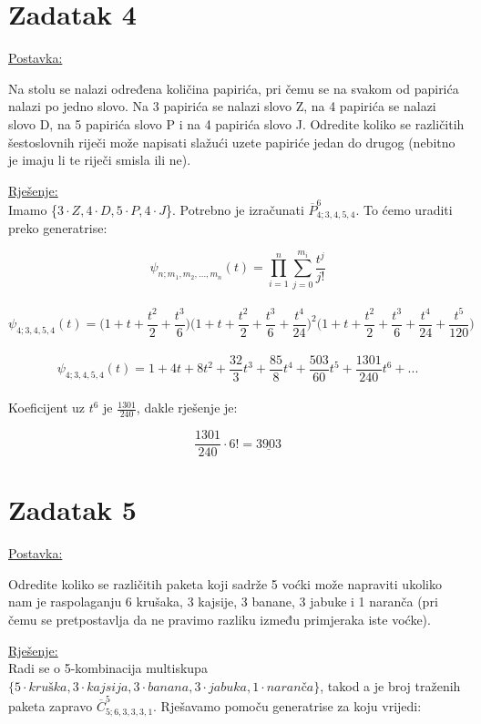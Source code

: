 \documentclass[12pt]{article}
\begin{document}
\section*{Zadatak 4\label{Z4}}	 

\underline{Postavka:}

Na stolu se nalazi određena količina papirića, pri čemu se na svakom od papirića nalazi po jedno slovo. Na 3 papirića se nalazi slovo Z, na 4 papirića se nalazi slovo D, na 5 papirića slovo P i na 4 papirića slovo J. Odredite koliko se različitih šestoslovnih riječi može napisati slažući uzete papiriće jedan do drugog (nebitno je imaju li te riječi smisla ili ne).

\underline{Rješenje:}\\

Imamo \{$3\cdot Z, 4 \cdot D, 5\cdot P, 4\cdot J$\}. Potrebno je izračunati $\overline{P}_{4; 3, 4, 5, 4}^{6}$. To ćemo uraditi preko generatrise:

$$\psi_{n; m_{1}, m_{2},..., m_{n}}(t) = \prod_{i=1}^{n}\sum_{j=0}^{m_{i}} \frac{t^j}{j!}$$\\
$$\psi_{4; 3, 4, 5, 4}(t) = \bigg(1 + t + \frac{t^2}{2} + \frac{t^3}{6}\bigg)\bigg(1 + t + \frac{t^2}{2} + \frac{t^3}{6} + \frac{t^4}{24}\bigg)^2\bigg(1 + t + \frac{t^2}{2} + \frac{t^3}{6} + \frac{t^4}{24} + \frac{t^5}{120}\bigg)$$\\
$$\psi_{4; 3, 4, 5, 4}(t) =  1 + 4t +  8 t^2 +  \frac{32}{3}t^3 + \frac{85}{8} t^4 +  \frac{503}{60}t^5+\frac{1301}{240} t^6 + ...$$\\

Koeficijent uz $t^6$ je $\frac{1301}{240}$, dakle rješenje je:

$$\frac{1301}{240} \cdot 6! = \underline{3903}$$
\newpage
\section*{Zadatak 5\label{Z5}}	 

\underline{Postavka:}

Odredite koliko se različitih paketa koji sadrže 5 voćki može napraviti ukoliko nam je raspolaganju 6 krušaka, 3 kajsije, 3 banane, 3 jabuke i 1 naranča (pri čemu se pretpostavlja da ne pravimo razliku između primjeraka iste voćke).

\underline{Rješenje:}\\

Radi se o 5-kombinacija multiskupa $ \{5 \cdot kruška, 3\cdot kajsija, 3\cdot banana, 3\cdot jabuka, 1\cdot naranča\}$, takod a je broj traženih paketa zapravo $\overline{C}_{5; 6, 3, 3, 3, 1}^{5}$. Rješavamo pomoču generatrise za koju vrijedi:
\end{document}
